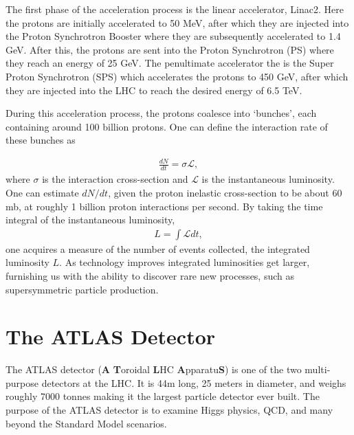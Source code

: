 \noindent The first phase of the acceleration process is the linear accelerator, Linac2. 
Here the protons are initially accelerated to 50 MeV, after which they are injected into the Proton Synchrotron Booster where they are subsequently accelerated to 1.4 GeV.
After this, the protons are sent into the Proton Synchrotron (PS) where they reach an energy of 25 GeV.
The penultimate accelerator the is the Super Proton Synchrotron (SPS) which accelerates the protons to 450 GeV, after which they are injected into the LHC to reach the desired energy of 6.5 TeV.

During this acceleration process, the protons coalesce into `bunches', each containing around 100 billion protons.
One can define the interaction rate of these bunches as

\begin{align}
\frac{d N}{d t} = \sigma \mathcal{L},
\end{align}
where $\sigma$ is the interaction cross-section and $\mathcal{L}$ is the instantaneous luminosity.
One can estimate $dN/dt$, given the proton inelastic cross-section to be about 60 mb, at roughly 1 billion proton interactions per second.
By taking the time integral of the instantaneous luminosity, 
\begin{align}
L = \int \mathcal{L} dt,
\end{align}
one acquires a measure of the number of events collected, the integrated luminosity $L$. 
As technology improves integrated luminosities get larger, furnishing us with the ability to discover rare new processes, such as supersymmetric particle production.

\section{The ATLAS Detector}
The ATLAS detector (\textbf{A} \textbf{T}oroidal \textbf{L}HC \textbf{A}pparatu\textbf{S}) is one of the two multi-purpose detectors at the LHC.
It is 44m long, 25 meters in diameter, and weighs roughly 7000 tonnes making it the largest particle detector ever built.
The purpose of the ATLAS detector is to examine Higgs physics, QCD, and many beyond the Standard Model scenarios.

